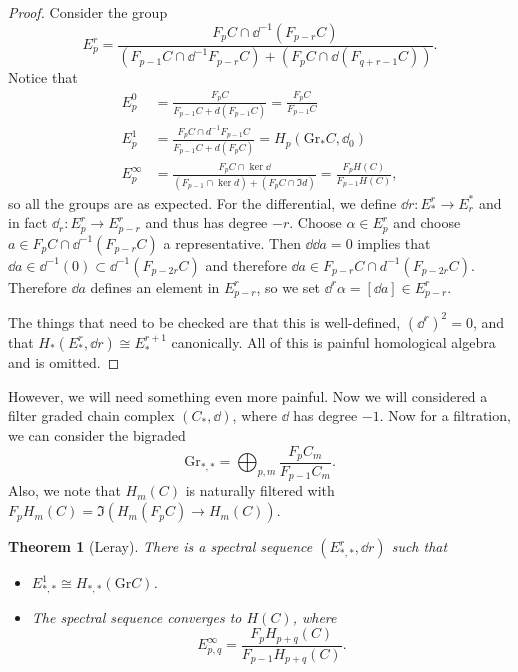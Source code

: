\documentclass[leqno, openany]{memoir}
\newtheorem{thm}{Theorem}[section]
\theoremstyle{definition}
\theoremstyle{remark}
\theoremstyle{plain}
\theoremstyle{definition}
\theoremstyle{remark}
\newcommand{\mr}[1]{\mathrm{#1}}
\begin{document}
\begin{proof}
    Consider the group
    \[ E_p^r = \frac{F_p C \cap \dd^{-1}(F_{p-r} C)}{(F_{p-1} C \cap \dd^{-1} F_{p-r} C) + (F_p C \cap \dd(F_{q+r-1} C))}. \]
    Notice that
    \begin{align*}
        E_p^0 &= \frac{F_p C}{F_{p-1} C + d(F_{p-1} C)} = \frac{F_p C}{F_{p-1} C} \\
        E_p^1 &= \frac{F_p C \cap d^{-1} F_{p-1} C}{F_{p-1}C + d(F_p C)} = H_p(\mr{Gr}_* C, \dd_0) \\
        E_p^{\infty} &= \frac{F_p C \cap \ker \dd}{(F_{p-1} \cap \ker d) + (F_p C \cap \Im d)} = \frac{F_p H(C)}{F_{p-1} H(C)},
    \end{align*}
    so all the groups are as expected. For the differential, we define $\dd{r} \colon E_*^r \to E_r^*$ and in fact $\dd_r \colon E_p^r \to E_{p-r}^r$ and thus has degree $-r$. Choose $\alpha \in E_p^r$ and choose $a \in F_p C \cap \dd^{-1}(F_{p-r} C)$ a representative. Then $\dd{\dd{a}} = 0$ implies that $\dd{a} \in \dd^{-1}(0) \subset \dd^{-1}(F_{p-2r} C)$ and therefore $\dd{a} \in F_{p-r} C \cap d^{-1}(F_{p-2r} C)$. Therefore $\dd{a}$ defines an element in $E_{p-r}^r$, so we set $\dd^r \alpha = [\dd{a}] \in E_{p-r}^r$.

    The things that need to be checked are that this is well-defined, ${(\dd^r)}^2 = 0$, and that $H_*(E_*^r, \dd{r}) \cong E_*^{r+1}$ canonically. All of this is painful homological algebra and is omitted.
\end{proof}

However, we will need something even more painful. Now we will considered a filter graded chain complex $(C_*, \dd)$, where $\dd$ has degree $-1$. Now for a filtration, we can consider the bigraded
\[ \mr{Gr}_{*,*} = \bigoplus_{p,m} \frac{F_p C_m}{F_{p-1} C_m}. \]
Also, we note that $H_m(C)$ is naturally filtered with $F_p H_m(C) = \Im(H_m (F_p C) \to H_m(C))$.

\begin{thm}[Leray]
    There is a spectral sequence $(E_{*,*}^r, \dd{r})$ such that
    \begin{itemize}
        \item $E^1_{*,*} \cong H_{*,*}(\mr{Gr} C)$.
        \item The spectral sequence converges to $H(C)$, where
            \[ E_{p,q}^{\infty} = \frac{F_p H_{p+q}(C)}{F_{p-1}H_{p+q}(C)}. \]
    \end{itemize}
\end{thm}
\end{document}
